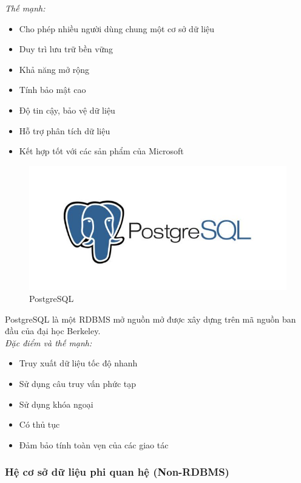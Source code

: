 \textit{Thế mạnh:}
\begin{itemize}
    \item Cho phép nhiều người dùng chung một cơ sở dữ liệu
    \item Duy trì lưu trữ bền vững
    \item Khả năng mở rộng
    \item Tính bảo mật cao
    \item Độ tin cậy, bảo vệ dữ liệu
    \item Hỗ trợ phân tích dữ liệu
    \item Kết hợp tốt với các sản phẩm của Microsoft
\end{itemize}

\begin{figure}[!h]
    \centering
    \includegraphics[scale=0.5]{img/postgre-sql.jpg}
    \caption{PostgreSQL}
\end{figure}

PostgreSQL là một RDBMS mở nguồn mở được xây dựng trên mã nguồn ban đầu của đại học Berkeley.\\

\textit{Đặc điểm và thế mạnh:}
\begin{itemize}
    \item Truy xuất dữ liệu tốc độ nhanh
    \item Sử dụng câu truy vấn phức tạp
    \item Sử dụng khóa ngoại
    \item Có thủ tục
    \item Đảm bảo tính toàn vẹn của các giao tác
\end{itemize}

\subsubsection{Hệ cơ sở dữ liệu phi quan hệ (Non-RDBMS)}

